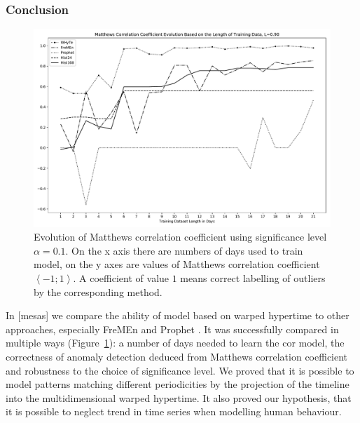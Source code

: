 \subsubsection{Conclusion}
\begin{figure}[htb]
\begin{center}
    \includegraphics[width=1.0\columnwidth]{fig/mathew_graph_90}
    \caption{Evolution of Matthews correlation coefficient using significance level $\alpha=0.1$. On the x axis there are numbers of days used to train model, on the y axes are values of Matthews correlation coefficient $\left<-1;1\right>$. A coefficient of value $1$ means correct labelling of outliers by the corresponding method.   \label{graph:mathew90}}

\end{center}
\end{figure}

In [mesas] we compare the ability of model based on warped hypertime to other approaches, especially FreMEn \cite{krajnik2017fremen} and Prophet \cite{taylor2018forecasting}. 
It was successfully compared in multiple ways (Figure~\ref{graph:mathew90}): a number of days needed to learn the cor model, the correctness of anomaly detection deduced from Matthews correlation coefficient \cite{matthews1975comparison} and robustness to the choice of significance level.
We proved that it is possible to model patterns matching different periodicities by the projection of the timeline into the multidimensional warped hypertime.
It also proved our hypothesis, that it is possible to neglect trend in time series when modelling human behaviour.



